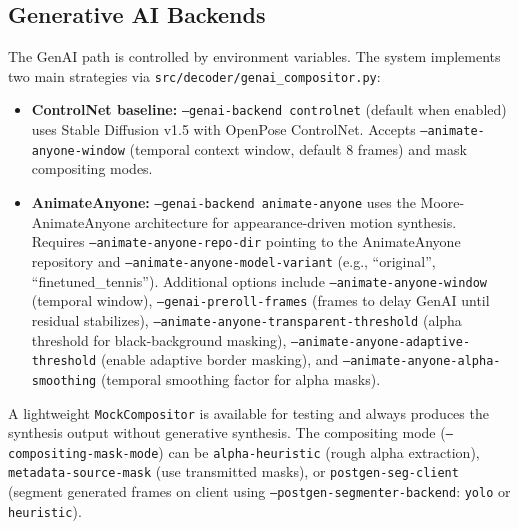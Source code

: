 \documentclass[manuscript, screen]{acmart}
\begin{document}
\subsection{Generative AI Backends}
The GenAI path is controlled by environment variables. The system implements two main strategies via \texttt{src/decoder/genai\_compositor.py}:
\begin{itemize}[topsep=0pt,itemsep=0pt,leftmargin=*]
    \item \textbf{ControlNet baseline:} \texttt{--genai-backend controlnet} (default when enabled) uses Stable Diffusion v1.5 with OpenPose ControlNet. Accepts \texttt{--animate-anyone-window} (temporal context window, default 8 frames) and mask compositing modes.
    \item \textbf{AnimateAnyone:} \texttt{--genai-backend animate-anyone} uses the Moore-AnimateAnyone architecture for appearance-driven motion synthesis. Requires \texttt{--animate-anyone-repo-dir} pointing to the AnimateAnyone repository and \texttt{--animate-anyone-model-variant} (e.g., ``original'', ``finetuned\_tennis''). Additional options include \texttt{--animate-anyone-window} (temporal window), \texttt{--genai-preroll-frames} (frames to delay GenAI until residual stabilizes), \texttt{--animate-anyone-transparent-threshold} (alpha threshold for black-background masking), \texttt{--animate-anyone-adaptive-threshold} (enable adaptive border masking), and \texttt{--animate-anyone-alpha-smoothing} (temporal smoothing factor for alpha masks).
\end{itemize}
A lightweight \texttt{MockCompositor} is available for testing and always produces the synthesis output without generative synthesis. The compositing mode (\texttt{--compositing-mask-mode}) can be \texttt{alpha-heuristic} (rough alpha extraction), \texttt{metadata-source-mask} (use transmitted masks), or \texttt{postgen-seg-client} (segment generated frames on client using \texttt{--postgen-segmenter-backend}: \texttt{yolo} or \texttt{heuristic}).
\end{document}
